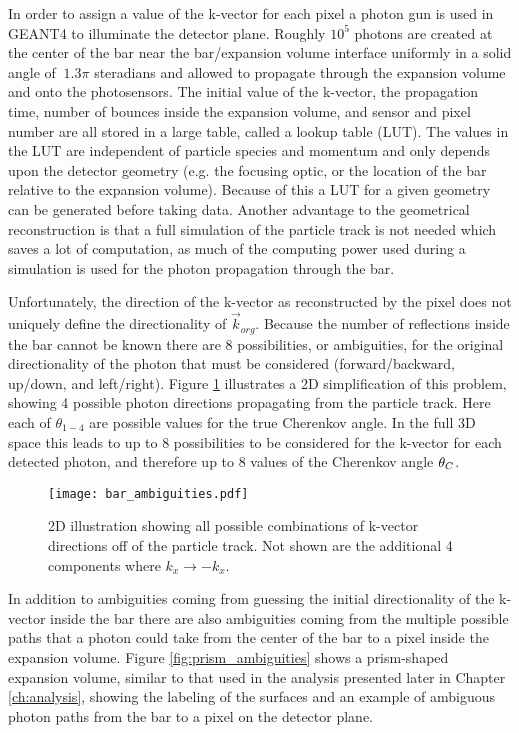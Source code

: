 In order to assign a value of the k-vector for each pixel a photon gun is used in GEANT4 to illuminate the detector plane. Roughly $10^5$ photons are created at the center of the bar near the bar/expansion volume interface uniformly in a solid angle of $~1.3\pi$ steradians and allowed to propagate through the expansion volume and onto the photosensors. The initial value of the k-vector, the propagation time,  number of bounces inside the expansion volume, and sensor and pixel number are all stored in a large table, called a lookup table (LUT). The values in the LUT are independent of particle species and momentum and only depends upon the detector geometry (e.g. the focusing optic, or the location of the bar relative to the expansion volume). Because of this a LUT for a given geometry can be generated before taking data. Another advantage to the geometrical reconstruction is that a full simulation of the particle track is not needed which saves a lot of computation, as much of the computing power used during a simulation is used for the photon propagation through the bar.

Unfortunately, the direction of the k-vector as reconstructed by the pixel does not uniquely define the directionality of $\vec{k}_{org}$. Because the number of reflections inside the bar cannot be known there are 8 possibilities, or ambiguities, for the original directionality of the photon that must be considered (forward/backward, up/down, and left/right). Figure \ref{fig:bar_ambiguities} illustrates a 2D simplification of this problem, showing 4 possible photon directions propagating from the particle track. Here each of $\theta_{1-4}$ are possible values for the true Cherenkov angle. In the full 3D space this leads to up to 8 possibilities to be considered for the k-vector for each detected photon, and therefore up to 8 values of the Cherenkov angle $\theta_{C}$.

\begin{figure}[!htb]
	\centering
	\texttt{[image: bar\_ambiguities.pdf]}
	\caption{2D illustration showing all possible combinations of k-vector directions off of the particle track. Not shown are the additional 4 components where $k_x \rightarrow -k_x$.}
	\label{fig:bar_ambiguities}
\end{figure}

In addition to ambiguities coming from guessing the initial directionality of the k-vector inside the bar there are also ambiguities coming from the multiple possible paths that a photon could take from the center of the bar to a pixel inside the expansion volume. Figure \ref{fig:prism_ambiguities} shows a prism-shaped expansion volume, similar to that used in the analysis presented later in Chapter \ref{ch:analysis}, showing the labeling of the surfaces and an example of ambiguous photon paths from the bar to a pixel on the detector plane.

